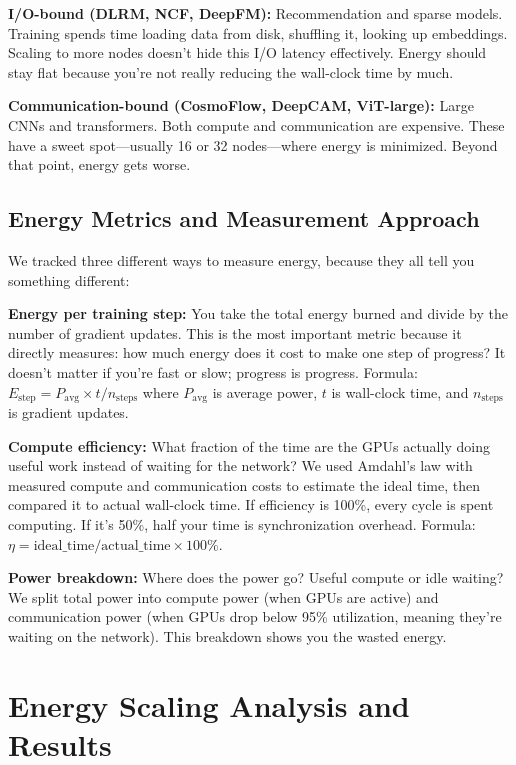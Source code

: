 \documentclass[conference]{IEEEtran}
\begin{document}
\textbf{I/O-bound (DLRM, NCF, DeepFM):} Recommendation and sparse models. Training spends time loading data from disk, shuffling it, looking up embeddings. Scaling to more nodes doesn't hide this I/O latency effectively. Energy should stay flat because you're not really reducing the wall-clock time by much.

\textbf{Communication-bound (CosmoFlow, DeepCAM, ViT-large):} Large CNNs and transformers. Both compute and communication are expensive. These have a sweet spot---usually 16 or 32 nodes---where energy is minimized. Beyond that point, energy gets worse.

\subsection{Energy Metrics and Measurement Approach}

We tracked three different ways to measure energy, because they all tell you something different:

\textbf{Energy per training step:} You take the total energy burned and divide by the number of gradient updates. This is the most important metric because it directly measures: how much energy does it cost to make one step of progress? It doesn't matter if you're fast or slow; progress is progress. Formula: $E_{\text{step}} = P_{\text{avg}} \times t / n_{\text{steps}}$ where $P_{\text{avg}}$ is average power, $t$ is wall-clock time, and $n_{\text{steps}}$ is gradient updates.

\textbf{Compute efficiency:} What fraction of the time are the GPUs actually doing useful work instead of waiting for the network? We used Amdahl's law with measured compute and communication costs to estimate the ideal time, then compared it to actual wall-clock time. If efficiency is 100\%, every cycle is spent computing. If it's 50\%, half your time is synchronization overhead. Formula: $\eta = \text{ideal\_time} / \text{actual\_time} \times 100\%$.

\textbf{Power breakdown:} Where does the power go? Useful compute or idle waiting? We split total power into compute power (when GPUs are active) and communication power (when GPUs drop below 95\% utilization, meaning they're waiting on the network). This breakdown shows you the wasted energy.

\section{Energy Scaling Analysis and Results}
\end{document}
